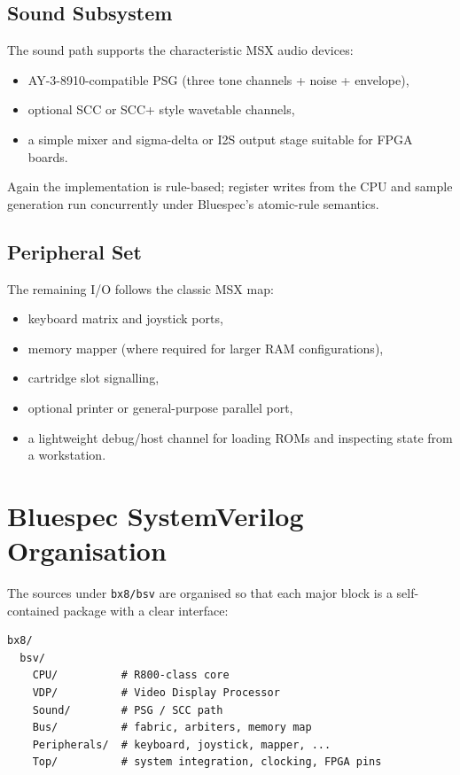 \documentclass[11pt,a4paper]{article}
\begin{document}
\subsection{Sound Subsystem}

The sound path supports the characteristic MSX audio devices:
\begin{itemize}[leftmargin=1.5em]
  \item AY-3-8910-compatible PSG (three tone channels + noise + envelope),
  \item optional SCC or SCC+ style wavetable channels,
  \item a simple mixer and sigma-delta or I2S output stage suitable for FPGA boards.
\end{itemize}
Again the implementation is rule-based; register writes from the CPU and sample generation run concurrently under Bluespec's atomic-rule semantics.

\subsection{Peripheral Set}

The remaining I/O follows the classic MSX map:
\begin{itemize}[leftmargin=1.5em]
  \item keyboard matrix and joystick ports,
  \item memory mapper (where required for larger RAM configurations),
  \item cartridge slot signalling,
  \item optional printer or general-purpose parallel port,
  \item a lightweight debug/host channel for loading ROMs and inspecting state from a workstation.
\end{itemize}

\section{Bluespec SystemVerilog Organisation}

The sources under \texttt{bx8/bsv} are organised so that each major block is a self-contained package with a clear interface:

\begin{lstlisting}
bx8/
  bsv/
    CPU/          # R800-class core
    VDP/          # Video Display Processor
    Sound/        # PSG / SCC path
    Bus/          # fabric, arbiters, memory map
    Peripherals/  # keyboard, joystick, mapper, ...
    Top/          # system integration, clocking, FPGA pins
\end{lstlisting}
\end{document}
